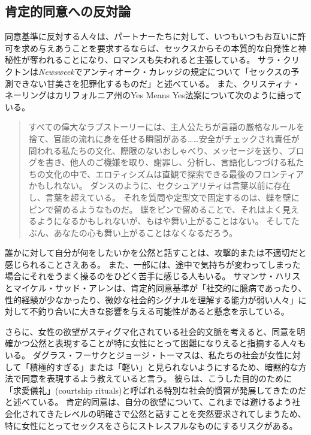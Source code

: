 \documentclass[paper=a4,book,openany]{jlreq}
\newcommand{\ig}[1]{}           %
\begin{document}
\subsection{肯定的同意への反対論}

同意基準に反対する人々は、パートナーたちに対して、いつもいつもお互いに許可を求め与えあうことを要求するならば、セックスからその本質的な自発性と神秘性が奪われることになり、ロマンスも失われると主張している。
サラ・クリクトンは\emph{Newsweek}でアンティオーク・カレッジの規定について「セックスの予測できない甘美さを犯罪化するものだ」と述べている\citep{crichton93:_sexual_correc}。
また、クリスティナ・ネーリングはカリフォルニア州のYes Means Yes法案について次のように語っている。

\begin{quote}

すべての偉大なラブストーリーには、主人公たちが言語の厳格なルールを捨て、官能の流れに身を任せる瞬間がある……安全がチェックされ責任が問われる私たちの文化、際限のないおしゃべり、メッセージを送り、ブログを書き、他人のご機嫌を取り、謝罪し、分析し、言語化しつづける私たちの文化の中で、エロティシズムは直観で探索できる最後のフロンティアかもしれない。
ダンスのように、セクシュアリティは言葉以前に存在し、言葉を超えている。
それを質問や定型文で固定するのは、蝶を壁にピンで留めるようなものだ。
蝶をピンで留めることで、それはよく見えるようになるかもしれないが、もはや舞い上がることはない。
そしてたぶん、あなたの心も舞い上がることはなくなるだろう。
\citep{nehring15:_are_today_legal_defin_rape}
\end{quote}

誰かに対して自分が何をしたいかを公然と話すことは、攻撃的または不適切だと感じられることさえある。
また、一部には、途中で気持ちが変わってしまった場合にそれをうまく操るのをひどく苦手に感じる人もいる。
サマンサ・ハリス\ig{Samantha Harris}とマイケル・サッド・アレン\ig{Michael Thad Allen}は、肯定的同意基準が「社交的に臆病であったり、性的経験が少なかったり、微妙な社会的シグナルを理解する能力が弱い人々」に対して不釣り合いに大きな影響を与える可能性があると懸念を示している\citep{harris20:_bad_vibrat}。

さらに、女性の欲望がスティグマ化されている社会的文脈を考えると、同意を明確かつ公然と表現することが特に女性にとって困難になりえると指摘する人々もいる。
ダグラス・フーサク\ig{Douglas Husak}とジョージ・トーマス\ig{George C. Thomas}は、私たちの社会が女性に対して「積極的すぎる」または「軽い」と見られないようにするため、暗黙的な方法で同意を表現するよう教えていると言う。
彼らは、こうした目的のために「求愛儀礼」(courtship rituals)と呼ばれる特別な社会的慣習が発展してきたのだと述べている。
肯定的同意は、自分の欲望について、これまでは避けるよう社会化されてきたレベルの明確さで公然と話すことを突然要求されてしまうため、特に女性にとってセックスをさらにストレスフルなものにするリスクがある\citep{husak92:_date}。
\end{document}
